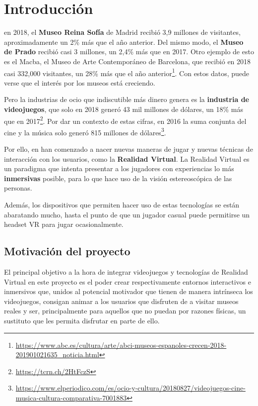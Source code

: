 \chapter{Introducción}
\label{chap:introduccion}

 en 2018, el \textbf{Museo Reina Sofía} de Madrid recibió 3,9 millones de visitantes, aproximadamente un 2\% más que el año anterior. Del mismo modo, el \textbf{Museo de Prado} recibió casi 3 millones, un 2,4\% más que en 2017. Otro ejemplo de esto es el Macba, el Museo de Arte Contemporáneo de Barcelona, que recibió en 2018 casi 332,000 visitantes, un 28\% más que el año anterior\footnote{\url{https://www.abc.es/cultura/arte/abci-museos-espanoles-crecen-2018-201901021635_noticia.html}}. Con estos datos, puede verse que el interés por los museos está creciendo.

Pero la industrias de ocio que indiscutible más dinero genera es la \textbf{industria de videojuegos}, que solo en 2018 generó 43 mil millones de dólares, un 18\% más que en 2017\footnote{\url{https://tcrn.ch/2HtFczS}}. Por dar un contexto de estas cifras, en 2016 la suma conjunta del cine y la música solo generó 815 millones de dólares\footnote{\url{https://www.elperiodico.com/es/ocio-y-cultura/20180827/videojuegos-cine-musica-cultura-comparativa-7001883}}.

Por ello, en han comenzado a nacer nuevas maneras de jugar y nuevas técnicas de interacción con los usuarios, como la \textbf{Realidad Virtual}. La Realidad Virtual es un paradigma que intenta presentar a los jugadores con experiencias lo más \textbf{inmersivas} posible, para lo que hace uso de la visión estereoscópica de las personas.

Además, los dispositivos que permiten hacer uso de estas tecnologías se están abaratando mucho, hasta el punto de que un jugador casual puede permitirse un headset \acs{VR} para jugar ocasionalmente. 

\section{Motivación del proyecto}

El principal objetivo a la hora de integrar videojuegos y tecnologías de Realidad Virtual en este proyecto es el poder crear respectivamente entornos interactivos e inmersivos que, unidos al potencial motivador que tienen de manera intrínseca los videojuegos, consigan animar a los usuarios que disfruten de \MineRVa a visitar museos reales y ser, principalmente para aquellos que no puedan por razones físicas, un sustituto que les permita disfrutar en parte de ello. 

